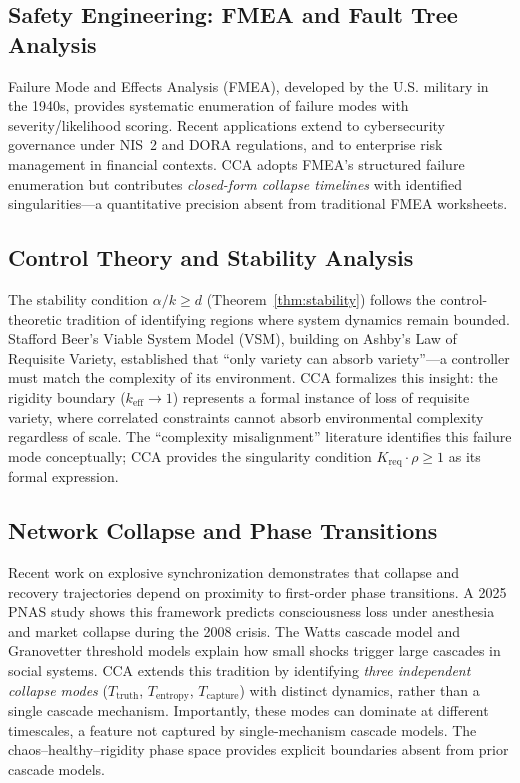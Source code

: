 \documentclass[11pt,a4paper]{article}
\theoremstyle{definition}
\theoremstyle{remark}
\newcommand{\keff}{k_{\text{eff}}}
\newcommand{\Kreq}{K_{\text{req}}}
\newcommand{\Ttruth}{T_{\text{truth}}}
\newcommand{\Tentropy}{T_{\text{entropy}}}
\newcommand{\Tcapture}{T_{\text{capture}}}
\begin{document}
\subsection{Safety Engineering: FMEA and Fault Tree Analysis}

Failure Mode and Effects Analysis (FMEA), developed by the U.S. military in the 1940s, provides systematic enumeration of failure modes with severity/likelihood scoring. Recent applications extend to cybersecurity governance under NIS~2 and DORA regulations, and to enterprise risk management in financial contexts. CCA adopts FMEA's structured failure enumeration but contributes \textit{closed-form collapse timelines} with identified singularities---a quantitative precision absent from traditional FMEA worksheets.

\subsection{Control Theory and Stability Analysis}

The stability condition $\alpha/k \geq d$ (Theorem~\ref{thm:stability}) follows the control-theoretic tradition of identifying regions where system dynamics remain bounded. Stafford Beer's Viable System Model (VSM), building on Ashby's Law of Requisite Variety, established that ``only variety can absorb variety''---a controller must match the complexity of its environment. CCA formalizes this insight: the rigidity boundary ($\keff \to 1$) represents a formal instance of loss of requisite variety, where correlated constraints cannot absorb environmental complexity regardless of scale. The ``complexity misalignment'' literature identifies this failure mode conceptually; CCA provides the singularity condition $\Kreq \cdot \rho \geq 1$ as its formal expression.

\subsection{Network Collapse and Phase Transitions}

Recent work on explosive synchronization demonstrates that collapse and recovery trajectories depend on proximity to first-order phase transitions. A 2025 PNAS study shows this framework predicts consciousness loss under anesthesia and market collapse during the 2008 crisis. The Watts cascade model and Granovetter threshold models explain how small shocks trigger large cascades in social systems. CCA extends this tradition by identifying \textit{three independent collapse modes} ($\Ttruth$, $\Tentropy$, $\Tcapture$) with distinct dynamics, rather than a single cascade mechanism. Importantly, these modes can dominate at different timescales, a feature not captured by single-mechanism cascade models. The chaos--healthy--rigidity phase space provides explicit boundaries absent from prior cascade models.
\end{document}
